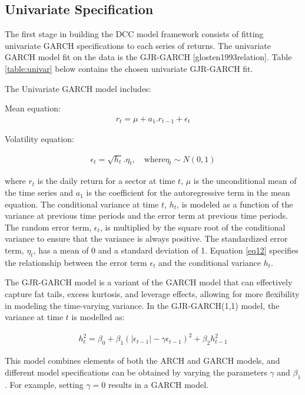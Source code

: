 \documentclass[11pt,preprint, authoryear]{elsarticle}
\numberwithin{equation}{section}
\numberwithin{figure}{section}
\numberwithin{table}{section}
\begin{document}
\hypertarget{univariate-specification}{%
\subsection{Univariate Specification}\label{univariate-specification}}

The first stage in building the DCC model framework consists of fitting
univariate GARCH specifications to each series of returns. The
univariate GARCH model fit on the data is the GJR-GARCH
{[}glosten1993relation{]}. Table \ref{table:univar} below contains the
chosen univariate GJR-GARCH fit.

The Univariate GARCH model includes:

Mean equation: \begin{align}
  r_t = \mu + a_1. r_{t-1} + \epsilon_t  \label{eq11}
\end{align}

Volatility equation:

\begin{align}
  \epsilon_t = \sqrt{h_t}.\eta_t, \quad \text{where} \eta_t \sim N(0,1)  \label{eq12}
\end{align}

where \(r_t\) is the daily return for a sector at time \(t\), \(\mu\) is
the unconditional mean of the time series and \(a_1\) is the coefficient
for the autoregressive term in the mean equation. The conditional
variance at time \(t\), \(h_t\), is modeled as a function of the
variance at previous time periods and the error term at previous time
periods. The random error term, \(\epsilon_t\), is multiplied by the
square root of the conditional variance to ensure that the variance is
always positive. The standardized error term, \(\eta_t\), has a mean of
0 and a standard deviation of 1. Equation \ref{eq12} specifies the
relationship between the error term \(\epsilon_t\) and the conditional
variance \(h_t\).

The GJR-GARCH model is a variant of the GARCH model that can effectively
capture fat tails, excess kurtosis, and leverage effects, allowing for
more flexibility in modeling the time-varying variance. In the
GJR-GARCH(1,1) model, the variance at time \(t\) is modelled as:

\begin{align}
  h_t^2 = \beta_0 + \beta_1( |\epsilon_{t-1}| - \gamma \epsilon_{t-1})^2 + \beta_2 h_{t-1}^2  \label{eq13}
\end{align}

This model combines elements of both the ARCH and GARCH models, and
different model specifications can be obtained by varying the parameters
\(\gamma\) and \(\beta_1\). For example, setting \(\gamma = 0\) results
in a GARCH model.
\end{document}
